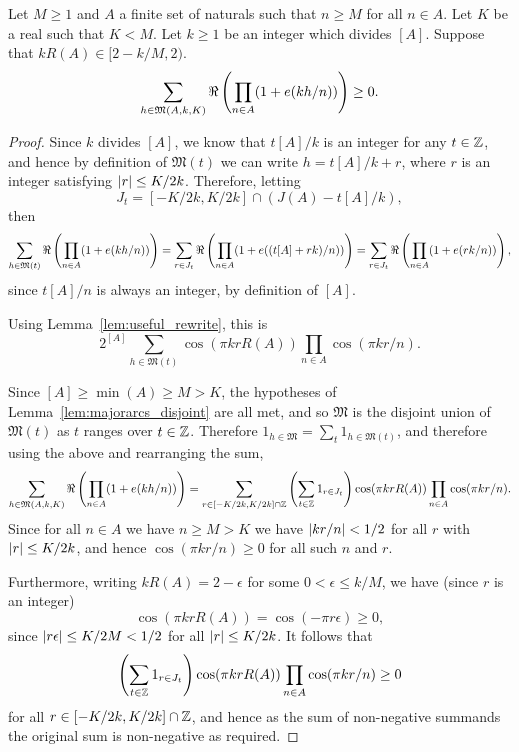 \begin{lemma}\label{lem:majorarcs}
  \leanok
Let $M\geq 1$ and $A$ a finite set of naturals such that $n\geq M$ for all $n\in A$. Let $K$ be a real such that $K<M$. Let $k\geq 1$ be an integer which divides $[A]$. Suppose that $kR(A) \in [2-k/M,2)$.
\[\sum_{h\in \mathfrak{M}(A,k,K)}\Re\left( \prod_{n\in A}(1+e(kh/n))\right) \geq 0.\]
\end{lemma}
\begin{proof}
  \leanok
{}
Since $k$ divides $[A]$, we know that $t[A]/k$ is an integer for any $t\in \mathbb{Z}$, and hence by definition of $\mathfrak{M}(t)$ we can write $h=t[A]/k+r$, where $r$ is an integer satisfying $\left\lvert r\right\rvert\leq K/2k$. Therefore, letting
\[J_t =[-K/2k,K/2k]\cap (J(A)-t[A]/k),\]
then
\[\sum_{h\in \mathfrak{M}(t)}\Re\left( \prod_{n\in A}(1+e(kh/n))\right)=\sum_{r\in J_t}\Re\left( \prod_{n\in A}(1+e((t[A]+rk)/n))\right)=\sum_{r\in J_t}\Re\left( \prod_{n\in A}(1+e(rk/n))\right),\]
since $t[A]/n$ is always an integer, by definition of $[A]$.

Using Lemma~\ref{lem:useful_rewrite}, this is
\[2^{[A]}\sum_{h\in \mathfrak{M}(t)}\cos(\pi krR(A))\prod_{n\in A}\cos(\pi kr/n).\]


Since $[A]\geq \min(A)\geq M>K$, the hypotheses of Lemma~\ref{lem:majorarcs_disjoint} are all met, and so $\mathfrak{M}$ is the disjoint union of $\mathfrak{M}(t)$ as $t$ ranges over $t\in \mathbb{Z}$. Therefore $1_{h\in\mathfrak{M}}=\sum_t 1_{h\in \mathfrak{M}(t)}$, and therefore using the above and rearranging the sum,
\[\sum_{h\in \mathfrak{M}(A,k,K)}\Re\left( \prod_{n\in A}(1+e(kh/n))\right)
=\sum_{r\in [-K/2k,K/2k]\cap\mathbb{Z}}\left( \sum_{t\in \mathbb{Z}}1_{r\in J_t}\right)\cos(\pi krR(A))\prod_{n\in A}\cos(\pi kr/n).\]
Since for all $n\in A$ we have $n\geq M>K$ we have $\left\lvert kr/n\right\rvert< 1/2$ for all $r$ with $\left\lvert r\right\rvert\leq K/2k$, and hence $\cos(\pi kr/n)\geq 0$ for all such $n$ and $r$.

Furthermore, writing $kR(A)=2-\epsilon$ for some $0<\epsilon\leq k/M$, we have (since $r$ is an integer)
\[\cos(\pi kr R(A)) = \cos(-\pi r\epsilon)\geq 0,\]
since $\left\lvert r\epsilon\right\rvert\leq K/2M<1/2$ for all $\left\lvert r\right\rvert\leq K/2k$. It follows that
\[\left( \sum_{t\in \mathbb{Z}}1_{r\in J_t}\right)\cos(\pi krR(A))\prod_{n\in A}\cos(\pi kr/n)\geq 0\]
for all $r\in [-K/2k,K/2k]\cap \mathbb{Z}$, and hence as the sum of non-negative summands the original sum is non-negative as required.
\end{proof}

